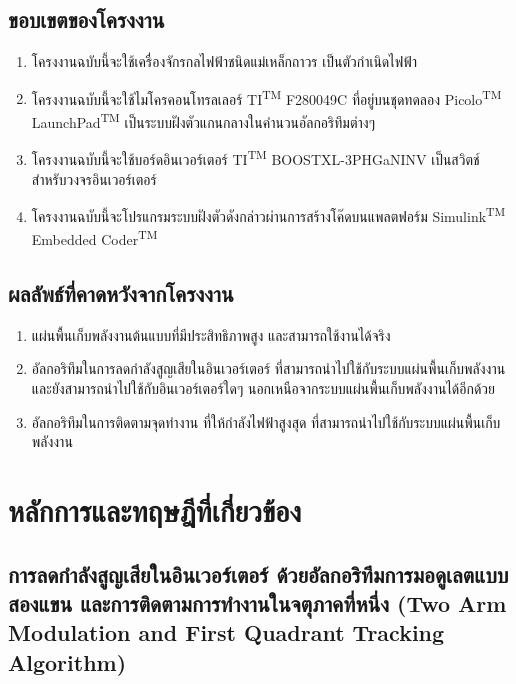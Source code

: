 \documentclass[11pt,a4paper]{article}
\begin{document}
\subsection{ขอบเขตของโครงงาน}
\begin{enumerate}
    \item โครงงานฉบับนี้จะใช้เครื่องจักรกลไฟฟ้าชนิดแม่เหล็กถาวร เป็นตัวกำเนิดไฟฟ้า
    \item โครงงานฉบับนี้จะใช้ไมโครคอนโทรลเลอร์ TI\textsuperscript{TM} F280049C ที่อยู่บนชุดทดลอง Picolo\textsuperscript{TM} LaunchPad\textsuperscript{TM} เป็นระบบฝังตัวแกนกลางในคำนวนอัลกอริทึมต่างๆ
    \item โครงงานฉบับนี้จะใช้บอร์ดอินเวอร์เตอร์ TI\textsuperscript{TM} BOOSTXL-3PHGaNINV เป็นสวิตช์สำหรับวงจรอินเวอร์เตอร์
    \item โครงงานฉบับนี้จะโปรแกรมระบบฝังตัวดังกล่าวผ่านการสร้างโค๊ดบนแพลตฟอร์ม Simulink\textsuperscript{TM} Embedded Coder\textsuperscript{TM}
\end{enumerate}

\subsection{ผลลัพธ์ที่คาดหวังจากโครงงาน}

\begin{enumerate}
    \item แผ่นพื้นเก็บพลังงานต้นแบบที่มีประสิทธิภาพสูง และสามารถใช้งานได้จริง
    \item อัลกอริทึมในการลดกำลังสูญเสียในอินเวอร์เตอร์ ที่สามารถนำไปใช้กับระบบแผ่นพื้นเก็บพลังงาน และยังสามารถนำไปใช้กับอินเวอร์เตอร์ใดๆ นอกเหนือจากระบบแผ่นพื้นเก็บพลังงานได้อีกด้วย
    \item อัลกอริทึมในการติดตามจุดทำงาน ที่ให้กำลังไฟฟ้าสูงสุด ที่สามารถนำไปใช้กับระบบแผ่นพื้นเก็บพลังงาน
\end{enumerate}

\section{หลักการและทฤษฎีที่เกี่ยวข้อง}

\subsection{การลดกำลังสูญเสียในอินเวอร์เตอร์ ด้วยอัลกอริทึมการมอดูเลตแบบสองแขน และการติดตามการทำงานในจตุภาคที่หนึ่ง (Two Arm Modulation and First Quadrant Tracking Algorithm)}
\end{document}
